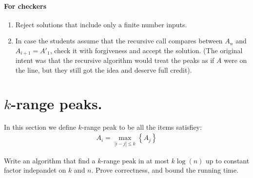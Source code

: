 \fi

\ifdefined\CHECK 
\paragraph{For checkers}
\begin{enumerate}
  \item Reject solutions that include only a finite number inputs.
  \item In case the students assume that the recursive call compares between $A_n$ and $A_{i+1} = A'_1$, check it with forgiveness and accept the solution. (The original intent was that the recursive algorithm would treat the peaks as if $A$ were on the line, but they still got the idea and deserve full credit).
\end{enumerate}
\fi




\section{$k$-range peaks.} In this section we define $k$-range peak to be all the items satisfiey:  
\begin{equation*}
  \begin{split}
    A_{i}= \max_{|i-j| \le k } \left\{ A_{j} \right\} 
  \end{split}
\end{equation*}

Write an algorithm that find a $k$-range peak in at most $k\log(n)$ up to constant factor indepandet on $k$ and $n$. Prove correctness, and bound the running time. 
\ifdefined\SOLUTION
